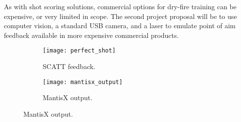 \documentclass[conference]{IEEEtran}
\begin{document}
As with shot scoring solutions, commercial options for dry-fire training can be expensive, or very limited in scope.
The second project proposal will be to use computer vision, a standard USB camera, and a laser to emulate point of aim feedback available in more expensive 
\cite{scatt} commercial products.

\begin{figure}[h]
	\begin{subfigure}{.5\textwidth}
		\centering
		\texttt{[image: perfect\_shot]}
		\caption{SCATT \cite{scatt} feedback.}
	\end{subfigure}
	\begin{subfigure}{.5\textwidth}
		\centering
		\texttt{[image: mantisx\_output]}
		\caption{MantisX output.}
	\end{subfigure}
\end{figure}




\clearpage


\end{document}
